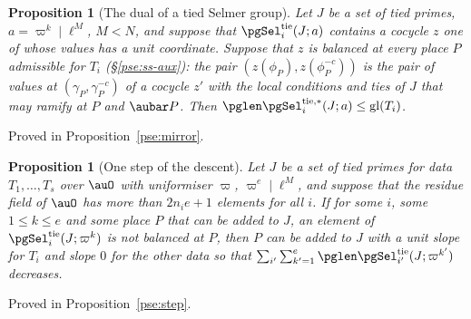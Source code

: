 \documentclass[10pt]{amsart}
\newtheorem{proposition}[theorem]{Proposition}
\theoremstyle{definition}
\theoremstyle{remark}
\begin{document}
\begin{proposition}[The dual of a tied Selmer group]\label{pg:mirror}
Let $J$ be a set of tied primes, $a=\varpi^k\mid\ell^M$, $M<N$, and suppose that
$\pgSel_i^{\mathrm{tie}}(J;a)$ contains a cocycle $z$ one of whose values has a unit coordinate.
Suppose that $z$ is balanced at every place $P$ admissible for $T_i$ (\S\ref{pse:ss-aux}): the pair
$(z(\phi_P),z(\phi_P^{-c}))$ is the pair of values at $(\gamma_P,\gamma_P^{-c})$ of a cocycle $z'$
with the local conditions and ties of $J$ that may ramify at $P$ and $\aubar P$. Then
$\pglen\pgSel_i^{\mathrm{tie},*}(J;a)\le\mathrm{gl}(T_i)$.
\end{proposition}
\smallskip\noindent Proved in Proposition~\ref{pse:mirror}.\par\smallskip

\begin{proposition}[One step of the descent]\label{pg:step}
Let $J$ be a set of tied primes for data $T_1,\dots,T_s$ over $\auO$ with uniformiser $\varpi$,
$\varpi^e\mid\ell^M$, and suppose that the residue field of $\auO$ has more than $2n_ie+1$ elements
for all $i$. If for some $i$, some $1\le k\le e$ and some place $P$ that can be added to $J$, an
element of $\pgSel^{\mathrm{tie}}_i(J;\varpi^k)$ is not balanced at $P$, then $P$ can be added to
$J$ with a unit slope for $T_i$ and slope $0$ for the other data so that
$\sum_{i'}\sum_{k'=1}^e\pglen\pgSel_{i'}^{\mathrm{tie}}(J;\varpi^{k'})$ decreases.
\end{proposition}
\smallskip\noindent Proved in Proposition~\ref{pse:step}.\par\smallskip
\end{document}
